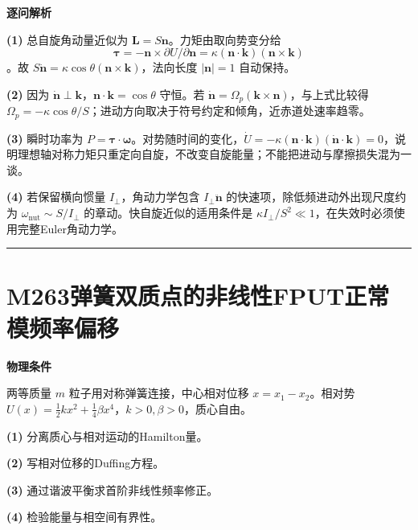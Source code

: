 \documentclass[UTF8,a4paper,11pt,oneside,openany]{ctexbook}
\begin{document}
\par\medskip\noindent\textbf{逐问解析}
\par\noindent\textbf{(1)} 总自旋角动量近似为 \(\boldsymbol L=S\boldsymbol n\)。力矩由取向势变分给 \[\boldsymbol\tau=-\boldsymbol n\times\partial U/\partial\boldsymbol n=\kappa(\boldsymbol n\cdot\boldsymbol k)(\boldsymbol n\times\boldsymbol k)\]。故 \(S\dot{\boldsymbol n}=\kappa\cos\theta(\boldsymbol n\times\boldsymbol k)\)，法向长度 \(|\boldsymbol n|=1\) 自动保持。
\par\noindent\textbf{(2)} 因为 \(\dot{\boldsymbol n}\perp\boldsymbol k\)，\(\boldsymbol n\cdot\boldsymbol k=\cos\theta\) 守恒。若 \(\dot{\boldsymbol n}=\Omega_p(\boldsymbol k\times\boldsymbol n)\)，与上式比较得 \(\Omega_p=-\kappa\cos\theta/S\)；进动方向取决于符号约定和倾角，近赤道处速率趋零。
\par\noindent\textbf{(3)} 瞬时功率为 \(P=\boldsymbol\tau\cdot\boldsymbol\omega\)。对势随时间的变化，\(\dot U=-\kappa(\boldsymbol n\cdot\boldsymbol k)(\dot{\boldsymbol n}\cdot\boldsymbol k)=0\)，说明理想轴对称力矩只重定向自旋，不改变自旋能量；不能把进动与摩擦损失混为一谈。
\par\noindent\textbf{(4)} 若保留横向惯量 \(I_\perp\)，角动力学包含 \(I_\perp\ddot{\boldsymbol n}\) 的快速项，除低频进动外出现尺度约为 \(\omega_{\mathrm{nut}}\sim S/I_\perp\) 的章动。快自旋近似的适用条件是 \(\kappa I_\perp/S^2\ll1\)，在失效时必须使用完整Euler角动力学。

\par\bigskip\hrule\bigskip
\section*{M263\quad 弹簧双质点的非线性FPUT正常模频率偏移}
\textbf{物理条件}\par 两等质量 \(m\) 粒子用对称弹簧连接，中心相对位移 \(x=x_1-x_2\)。相对势 \(U(x)=\frac12kx^2+\frac14\beta x^4\)，\(k>0,\beta>0\)，质心自由。
\par\noindent\textbf{(1)} 分离质心与相对运动的Hamilton量。
\par\noindent\textbf{(2)} 写相对位移的Duffing方程。
\par\noindent\textbf{(3)} 通过谐波平衡求首阶非线性频率修正。
\par\noindent\textbf{(4)} 检验能量与相空间有界性。
\end{document}
